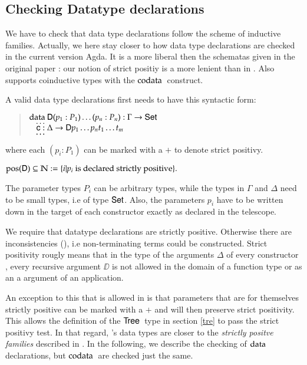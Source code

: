 \subsection{Checking Datatype declarations}
We have to check that data type declarations follow the scheme of inductive families.
Actually, we here stay closer to how data type declarations are checked in the current version Agda.
It is a more liberal then the schematas given in the original paper \cite{dubjier}: our notion of strict positiy is a more lenient than in \cite{dubjier}.
Also \mugda supports coinductive types with the $\mathrm{codata}\:$ construct.

A valid data type declarations first needs to have this syntactic form:
\begin{quote}
$\mathrm{data}\: \mathsf{D} ( p_1 : P_1) \ldots ( p_n : P_n) : \Gamma \rightarrow \mathsf{Set} $\\
$\hspace*{3mm} \ldots$\\
$\hspace*{3mm} \mathsf{c} : \Delta \rightarrow \mathsf{D} p_1 \ldots p_n t_1 \ldots t_m$\\
$\hspace*{3mm} \ldots$\\   
\end{quote}
\newcommand{\pos}{\mbox{pos}}
where each $(p_i : P_1) $ can be marked with a $+$ to denote strict positivy.
\begin{definition}
$\pos(\DD) \subseteq \cN := \{ i \vert p_i \mbox{ is declared strictly positive} \}. $ 
\end{definition}
The parameter types $P_i$ can be arbitrary types, while the types in $\Gamma$ and $\Delta$ need to be small types, i.e of type $\mathsf{Set}$. Also, the parameters $p_i$ have to be written down in the target of each constructor exactly as declared in the telescope.

We require that datatype declarations are strictly positive.
Otherwise there are inconsistencies (\cite{paulinmohring93inductive}), i.e non-terminating terms could be constructed.
Strict positivity rougly means that in the type of the arguments $\Delta$ of every constructor , every recursive argument $\DD$ is not allowed in the domain of a function type or as an a argument of an application.

An exception to this that is allowed in \mugda is that parameters that are for themselves strictly positive can be marked with a $+$ and will then preserve strict positivity. 
This allows the definition of the $\mathsf{Tree}\:$ type in section \ref{tre} to pass the strict positivy test. In that regard, \mugda 's data types are closer to the \emph{strictly positve families} described in \cite{alti:cats07}.
In the following, we describe the checking of $\mathrm{data}\:$ declarations, but $\mathrm{codata}\:$ are checked just the same.

